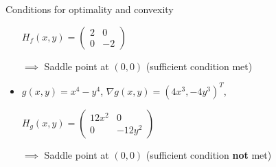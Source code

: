 \documentclass[11pt,compress,t,notes=noshow, xcolor=table]{beamer}
\begin{document}
\begin{vbframe}{Conditions for optimality and convexity}
\begin{itemize}
        $H_f(x,y) = \begin{pmatrix}2 & 0 \\ 0 & -2\end{pmatrix}$
        
        $\implies$ Saddle point at $(0,0)$ (sufficient condition met)

    \vspace{\baselineskip}
        
    \item $g(x,y) = x^4 - y^4$, $\nabla g(x,y) = (4x^3,-4y^3)^T$,
    
        $H_g(x,y) = \begin{pmatrix}12x^2 & 0 \\ 0 & -12y^2\end{pmatrix}$

        $\implies$ Saddle point at $(0,0)$ (sufficient condition \textbf{not} met)
\end{itemize}

\end{vbframe}

\endlecture
\end{document}
